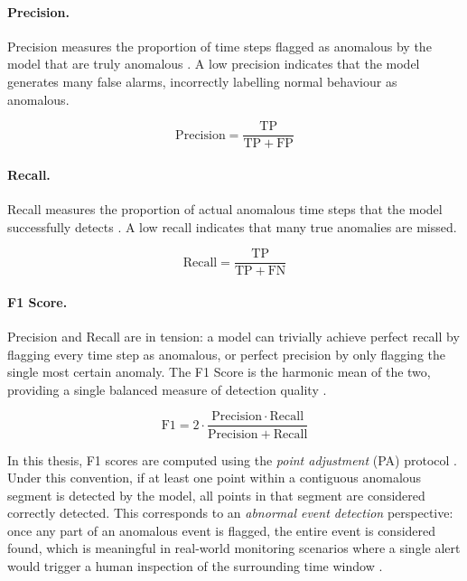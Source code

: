 \documentclass[twoside,11pt,openright]{report}
\begin{document}
\paragraph{Precision.}
Precision measures the proportion of time steps flagged as anomalous by the model that are
truly anomalous \cite{darban2024survey}. A low precision indicates that the model
generates many false alarms, incorrectly labelling normal behaviour as anomalous.

\begin{equation}
    \mathrm{Precision} = \frac{\mathrm{TP}}{\mathrm{TP} + \mathrm{FP}}
\end{equation}

\paragraph{Recall.}
Recall measures the proportion of actual anomalous time steps that the model successfully
detects \cite{darban2024survey}. A low recall indicates that many true anomalies are
missed.

\begin{equation}
    \mathrm{Recall} = \frac{\mathrm{TP}}{\mathrm{TP} + \mathrm{FN}}
\end{equation}

\paragraph{F1 Score.}
Precision and Recall are in tension: a model can trivially achieve perfect recall by flagging
every time step as anomalous, or perfect precision by only flagging the single most certain
anomaly. The F1 Score is the harmonic mean of the two, providing a single balanced measure
of detection quality \cite{darban2024survey}.

\begin{equation}
    \mathrm{F1} = 2 \cdot \frac{\mathrm{Precision} \cdot \mathrm{Recall}}{\mathrm{Precision} + \mathrm{Recall}}
\end{equation}

\noindent In this thesis, F1 scores are computed using the \emph{point adjustment} (PA)
protocol \cite{xu2018donut}. Under this convention, if at least one point within a contiguous
anomalous segment is detected by the model, all points in that segment are considered
correctly detected. This corresponds to an \emph{abnormal event detection} perspective: once
any part of an anomalous event is flagged, the entire event is considered found, which is
meaningful in real-world monitoring scenarios where a single alert would trigger a human
inspection of the surrounding time window \cite{xu2022detectionadjustment}.
\end{document}
